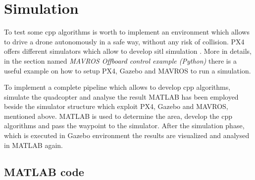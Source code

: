 \section{Simulation}
To test some \ac{cpp} algorithms is worth to implement an environment which allows to drive a drone autonomously in a safe way, without any risk of collision. PX4 offers different simulators which allow to develop \ac{sitl} simulation \cite{px4_simulation}. More in details, in the section named \textit{MAVROS Offboard control example (Python)} \cite{px4_ros_mavros} there is a useful example on how to setup PX4, Gazebo and MAVROS to run a simulation.

To implement a complete pipeline which allows to develop \ac{cpp} algorithms, simulate the quadcopter and analyse the result MATLAB has been employed beside the simulator structure which exploit PX4, Gazebo and MAVROS, mentioned above. MATLAB is used to determine the area, develop the \ac{cpp} algorithms and pass the waypoint to the simulator. After the simulation phase, which is executed in Gazebo environment the results are visualized and analysed in MATLAB again.

\subsection{MATLAB code} 

